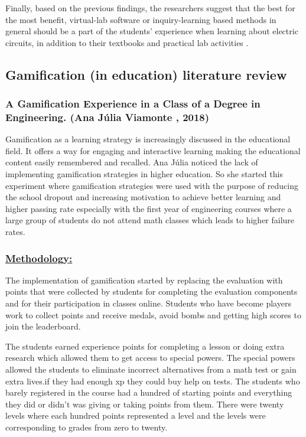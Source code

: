 \documentclass[../main.tex]{subfiles}
\begin{document}
Finally, based on the previous findings, the researchers suggest that the best for the most benefit, virtual-lab software or inquiry-learning based methods in general should be a part of the students' experience when learning about electric circuits, in addition to their textbooks and practical lab activities \cite{25}.

\subsection{Gamification (in education) literature review}

\subsubsection{A Gamification Experience in a Class of a Degree in Engineering. (Ana Júlia Viamonte , 2018)}

Gamification as a learning strategy is increasingly discussed in the educational field. It offers a way for engaging and interactive learning making the educational content easily remembered and recalled. Ana Júlia noticed the lack of implementing gamification strategies in higher education. So she started this experiment where gamification strategies were used with the purpose of reducing the school dropout and increasing motivation to achieve better learning and higher passing rate especially with the first year of engineering courses  where a large group of students do not attend math classes which leads to higher failure rates.

\subsubsection*{\underline{Methodology:}}
The implementation of gamification started by replacing the evaluation with points that were collected by students for completing the evaluation components and for their participation in classes online. Students who have become players work to collect points and receive medals, avoid bombs and getting high scores to join the leaderboard.

The students earned experience points for completing a lesson or doing extra research which allowed them to get access to special powers. The special powers allowed the students to eliminate incorrect alternatives from a math test or  gain extra lives.if they had enough \acrshort{xp} they could buy help on tests. The students who barely registered in the course had a hundred of starting points and everything they did or didn't  was giving or taking points from them. There were twenty levels where each hundred points represented a level and the levels were corresponding to grades from zero to twenty.
\end{document}
